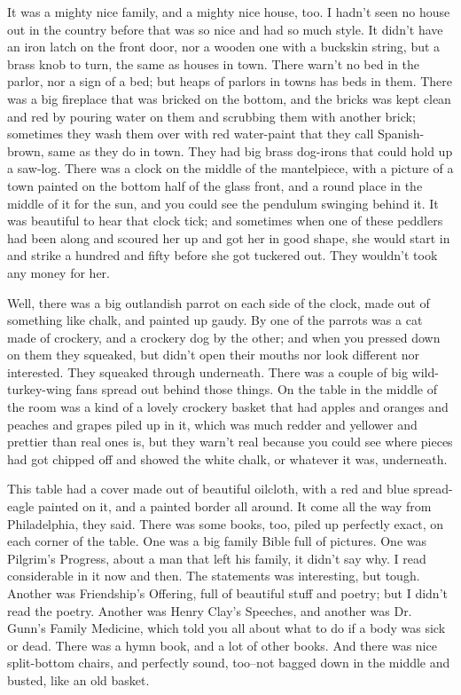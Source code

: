 It was a mighty nice family, and a mighty nice house, too.  I hadn't seen
no house out in the country before that was so nice and had so much
style.  It didn't have an iron latch on the front door, nor a wooden one
with a buckskin string, but a brass knob to turn, the same as houses in
town. There warn't no bed in the parlor, nor a sign of a bed; but heaps
of parlors in towns has beds in them.  There was a big fireplace that was
bricked on the bottom, and the bricks was kept clean and red by pouring
water on them and scrubbing them with another brick; sometimes they wash
them over with red water-paint that they call Spanish-brown, same as they
do in town.  They had big brass dog-irons that could hold up a saw-log.
There was a clock on the middle of the mantelpiece, with a picture of a
town painted on the bottom half of the glass front, and a round place in
the middle of it for the sun, and you could see the pendulum swinging
behind it.  It was beautiful to hear that clock tick; and sometimes when
one of these peddlers had been along and scoured her up and got her in
good shape, she would start in and strike a hundred and fifty before she
got tuckered out.  They wouldn't took any money for her.

Well, there was a big outlandish parrot on each side of the clock, made
out of something like chalk, and painted up gaudy.  By one of the parrots
was a cat made of crockery, and a crockery dog by the other; and when you
pressed down on them they squeaked, but didn't open their mouths nor look
different nor interested.  They squeaked through underneath.  There was a
couple of big wild-turkey-wing fans spread out behind those things.  On
the table in the middle of the room was a kind of a lovely crockery
basket that had apples and oranges and peaches and grapes piled up in it,
which was much redder and yellower and prettier than real ones is, but
they warn't real because you could see where pieces had got chipped off
and showed the white chalk, or whatever it was, underneath.

This table had a cover made out of beautiful oilcloth, with a red and
blue spread-eagle painted on it, and a painted border all around.  It
come all the way from Philadelphia, they said.  There was some books,
too, piled up perfectly exact, on each corner of the table.  One was a
big family Bible full of pictures.  One was Pilgrim's Progress, about a
man that left his family, it didn't say why.  I read considerable in it
now and then.  The statements was interesting, but tough.  Another was
Friendship's Offering, full of beautiful stuff and poetry; but I didn't
read the poetry.  Another was Henry Clay's Speeches, and another was Dr.
Gunn's Family Medicine, which told you all about what to do if a body was
sick or dead.  There was a hymn book, and a lot of other books.  And
there was nice split-bottom chairs, and perfectly sound, too--not bagged
down in the middle and busted, like an old basket.

